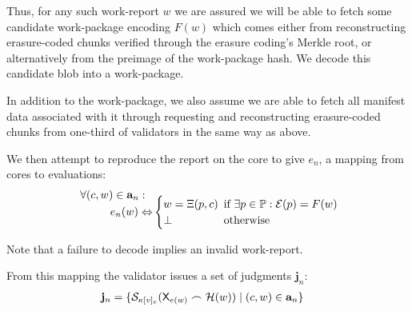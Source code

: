 Thus, for any such work-report $w$ we are assured we will be able to fetch some candidate work-package encoding $F(w)$ which comes either from reconstructing erasure-coded chunks verified through the erasure coding's Merkle root, or alternatively from the preimage of the work-package hash. We decode this candidate blob into a work-package.

In addition to the work-package, we also assume we are able to fetch all manifest data associated with it through requesting and reconstructing erasure-coded chunks from one-third of validators in the same way as above.

We then attempt to reproduce the report on the core to give $e_n$, a mapping from cores to evaluations: \vskip -7pt
\begin{equation}
  \begin{aligned}
    \forall (c, w) \in \mathbf{a}_n :\ \ &\\[-10pt]
    e_n(w) \Leftrightarrow &\begin{cases}
      w = \Xi(p, c)\!\!\! &\text{if } \exists p \in \mathbb{P}: \mathcal{E}(p) = F(w) \\
      \bot &\text{otherwise}
    \end{cases}
  \end{aligned}\!\!
\end{equation}

Note that a failure to decode implies an invalid work-report.

From this mapping the validator issues a set of judgments $\mathbf{j}_n$:
\begin{align}
  \mathbf{j}_n &= \{ \mathcal{S}_{\kappa[v]_e}(\mathsf{X}_{e(w)} \frown \mathcal{H}(w)) \mid (c, w) \in \mathbf{a}_n \}
\end{align}


